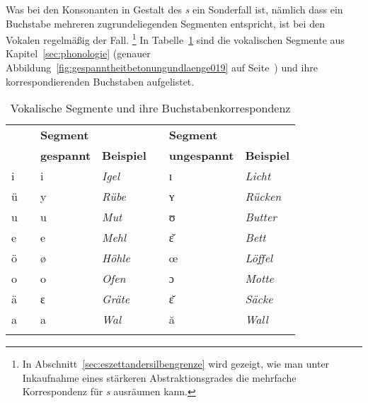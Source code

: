 Was bei den Konsonanten in Gestalt des \textit{s} ein Sonderfall ist, nämlich dass ein Buchstabe mehreren zugrundeliegenden Segmenten entspricht, ist bei den Vokalen regelmäßig der Fall.%
\footnote{In Abschnitt~\ref{sec:eszettandersilbengrenze} wird gezeigt, wie man unter Inkaufnahme eines stärkeren Abstraktionsgrades die mehrfache Korrespondenz für \textit{s} ausräumen kann.}
In Tabelle~\ref{tab:vokalschreibungen009} sind die vokalischen Segmente aus Kapitel~\ref{sec:phonologie} (genauer Abbildung~\ref{fig:gespanntheitbetonungundlaenge019} auf Seite~\pageref{fig:gespanntheitbetonungundlaenge019}) und ihre korrespondierenden Buchstaben aufgelistet.

\begin{table}[!htbp]
  \centering
    \begin{tabular}{lp{0.5cm}llp{0.25cm}ll}
      \lsptoprule
      \multirow{2}{*}{\textbf{Buchstabe}} && \multicolumn{2}{l}{\textbf{Segment}} && \multicolumn{2}{l}{\textbf{Segment}} \\
       && \textbf{gespannt} & \textbf{Beispiel} && \textbf{ungespannt} & \textbf{Beispiel} \\
      \midrule
      i  && i  & \textit{Igel} && ɪ & \textit{Licht} \\
      ü  && y  & \textit{Rübe} && ʏ & \textit{Rücken} \\
      u  && u  & \textit{Mut} && ʊ & \textit{Butter} \\
      e  && e  & \textit{Mehl} && ɛ̆ & \textit{Bett} \\
      ö  && ø & \textit{Höhle} && œ & \textit{Löffel} \\
      o  && o  & \textit{Ofen} && ɔ & \textit{Motte} \\
      ä  && ɛ  & \textit{Gräte} && ɛ̆ & \textit{Säcke} \\
      a  && a  & \textit{Wal} && ă & \textit{Wall} \\
      \lspbottomrule
    \end{tabular}
  \caption{Vokalische Segmente und ihre Buch\-staben\-korres\-pondenz}
  \label{tab:vokalschreibungen009}
\end{table}

